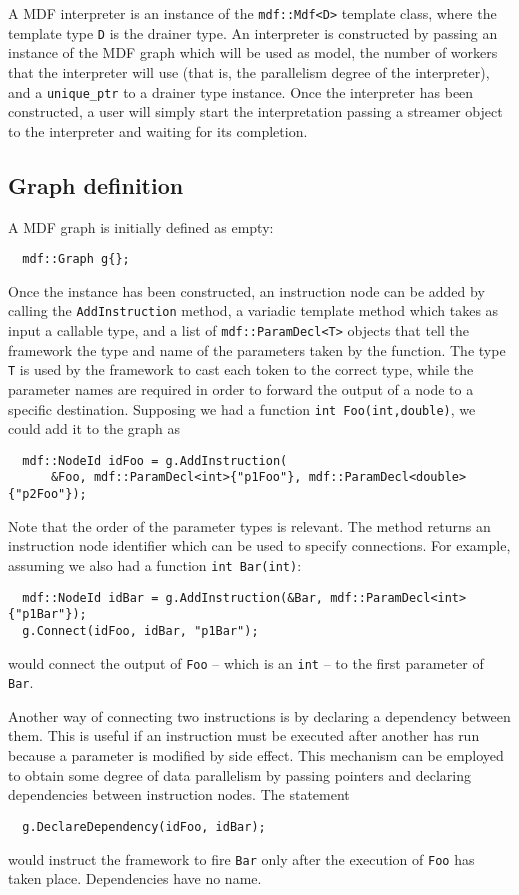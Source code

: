 \documentclass[a4paper, 11pt, oneside]{article}
\begin{document}
A MDF interpreter is an instance of the \texttt{mdf::Mdf<D>} template class, where the template type \texttt{D} is the drainer type. An interpreter is constructed by passing an instance of the MDF graph which will be used as model, the number of workers that the interpreter will use (that is, the parallelism degree of the interpreter), and a \texttt{unique\_ptr} to a drainer type instance. Once the interpreter has been constructed, a user will simply start the interpretation passing a streamer object to the interpreter and waiting for its completion.

\subsection{Graph definition}

A MDF graph is initially defined as empty:
\begin{verbatim}
  mdf::Graph g{};
\end{verbatim}
Once the instance has been constructed, an instruction node can be added by calling the \texttt{AddInstruction} method, a variadic template method which takes as input a callable type, and a list of \texttt{mdf::ParamDecl<T>} objects that tell the framework the type and name of the parameters taken by the function. The type \texttt{T} is used by the framework to cast each token to the correct type, while the parameter names are required in order to forward the output of a node to a specific destination. Supposing we had a function \texttt{int Foo(int,double)}, we could add it to the graph as
\begin{verbatim}
  mdf::NodeId idFoo = g.AddInstruction(
      &Foo, mdf::ParamDecl<int>{"p1Foo"}, mdf::ParamDecl<double>{"p2Foo"});
\end{verbatim}
Note that the order of the parameter types is relevant. The method returns an instruction node identifier which can be used to specify connections. For example, assuming we also had a function \texttt{int Bar(int)}:
\begin{verbatim}
  mdf::NodeId idBar = g.AddInstruction(&Bar, mdf::ParamDecl<int>{"p1Bar"});
  g.Connect(idFoo, idBar, "p1Bar");
\end{verbatim}
would connect the output of \texttt{Foo} -- which is an \texttt{int} -- to the first parameter of \texttt{Bar}.

Another way of connecting two instructions is by declaring a dependency between them. This is useful if an instruction must be executed after another has run because a parameter is modified by side effect. This mechanism can be employed to obtain some degree of data parallelism by passing pointers and declaring dependencies between instruction nodes. The statement
\begin{verbatim}
  g.DeclareDependency(idFoo, idBar);
\end{verbatim}
would instruct the framework to fire \texttt{Bar} only after the execution of \texttt{Foo} has taken place. Dependencies have no name. 
\end{document}
